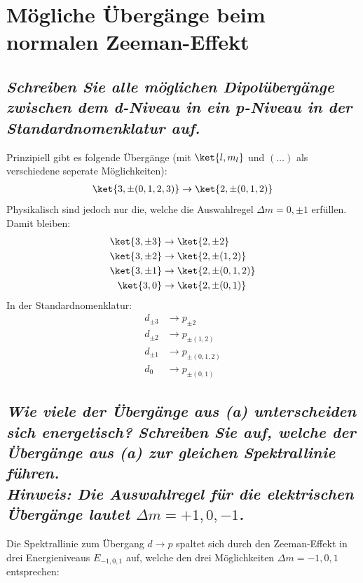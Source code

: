\documentclass[ex, minted]{exercise_4.0}
\begin{document}
\section{Mögliche Übergänge beim normalen Zeeman-Effekt}
\subsection{\it Schreiben Sie alle möglichen Dipolübergänge zwischen dem d-Niveau in ein p-Niveau in der Standardnomenklatur auf.}

\dottedlinett

Prinzipiell gibt es folgende Übergänge  (mit \(\ket{l,m_l}\) und \((\dots)\) als verschiedene seperate Möglichkeiten):
\begin{align*}
    \ket{3, \pm(0,1,2,3)} \to \ket{2, \pm(0,1,2)}
\end{align*}
Physikalisch sind jedoch nur die, welche die Auswahlregel \(\Delta m = 0,\pm1\) erfüllen. Damit bleiben:
\begin{align*}
    \ket{3, \pm3} &\to \ket{2, \pm2}\\
    \ket{3, \pm2} &\to \ket{2, \pm(1,2)}\\
    \ket{3, \pm1} &\to \ket{2, \pm(0,1,2)}\\
    \ket{3, 0} &\to \ket{2, \pm(0,1)}
\end{align*}
In der Standardnomenklatur:
\begin{align*}
    d_{\pm3} &\to p_{\pm2}\\
    d_{\pm2} &\to p_{\pm(1,2)}\\
    d_{\pm1} &\to p_{\pm(0,1,2)}\\
    d_0 &\to p_{\pm(0,1)}
\end{align*}

\subsection{\it Wie viele der Übergänge aus (a) unterscheiden sich energetisch? Schreiben Sie auf, welche der Übergänge aus (a) zur gleichen Spektrallinie führen.\\
Hinweis: Die Auswahlregel für die elektrischen Übergänge lautet \(\Delta m=+1,0,-1\).}

\dottedlinett

Die Spektrallinie zum Übergang \(d\to p\) spaltet sich durch den Zeeman-Effekt in drei Energieniveaus \(E_{-1,0,1}\) auf, welche den drei Möglichkeiten \(\Delta m = -1,0,1\) entsprechen:
\end{document}
